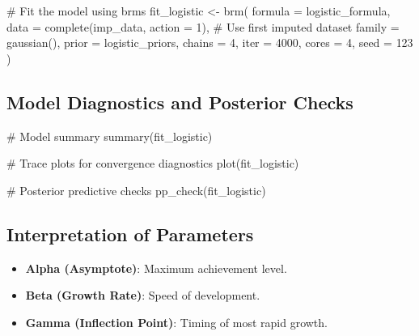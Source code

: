 \documentclass[
  letterpaper,
  DIV=11,
  numbers=noendperiod]{scrreprt}
\newenvironment{Shaded}{\begin{snugshade}}{\end{snugshade}}
\newcommand{\AttributeTok}[1]{\textcolor[rgb]{0.40,0.45,0.13}{#1}}
\newcommand{\CommentTok}[1]{\textcolor[rgb]{0.37,0.37,0.37}{#1}}
\newcommand{\DecValTok}[1]{\textcolor[rgb]{0.68,0.00,0.00}{#1}}
\newcommand{\FunctionTok}[1]{\textcolor[rgb]{0.28,0.35,0.67}{#1}}
\newcommand{\NormalTok}[1]{\textcolor[rgb]{0.00,0.23,0.31}{#1}}
\newcommand{\OtherTok}[1]{\textcolor[rgb]{0.00,0.23,0.31}{#1}}
\providecommand{\tightlist}{%
  \setlength{\itemsep}{0pt}\setlength{\parskip}{0pt}}\usepackage{longtable,booktabs,array}
\begin{document}
\begin{Shaded}
\begin{Highlighting}[]
\CommentTok{\# Fit the model using brms}
\NormalTok{fit\_logistic }\OtherTok{\textless{}{-}} \FunctionTok{brm}\NormalTok{(}
  \AttributeTok{formula =}\NormalTok{ logistic\_formula,}
  \AttributeTok{data =} \FunctionTok{complete}\NormalTok{(imp\_data, }\AttributeTok{action =} \DecValTok{1}\NormalTok{),  }\CommentTok{\# Use first imputed dataset}
  \AttributeTok{family =} \FunctionTok{gaussian}\NormalTok{(),}
  \AttributeTok{prior =}\NormalTok{ logistic\_priors,}
  \AttributeTok{chains =} \DecValTok{4}\NormalTok{,}
  \AttributeTok{iter =} \DecValTok{4000}\NormalTok{,}
  \AttributeTok{cores =} \DecValTok{4}\NormalTok{,}
  \AttributeTok{seed =} \DecValTok{123}
\NormalTok{)}
\end{Highlighting}
\end{Shaded}

\subsection{Model Diagnostics and Posterior
Checks}\label{model-diagnostics-and-posterior-checks}

\begin{Shaded}
\begin{Highlighting}[]
\CommentTok{\# Model summary}
\FunctionTok{summary}\NormalTok{(fit\_logistic)}

\CommentTok{\# Trace plots for convergence diagnostics}
\FunctionTok{plot}\NormalTok{(fit\_logistic)}

\CommentTok{\# Posterior predictive checks}
\FunctionTok{pp\_check}\NormalTok{(fit\_logistic)}
\end{Highlighting}
\end{Shaded}

\subsection{Interpretation of
Parameters}\label{interpretation-of-parameters}

\begin{itemize}
\tightlist
\item
  \textbf{Alpha (Asymptote)}: Maximum achievement level.
\item
  \textbf{Beta (Growth Rate)}: Speed of development.
\item
  \textbf{Gamma (Inflection Point)}: Timing of most rapid growth.
\end{itemize}
\end{document}
